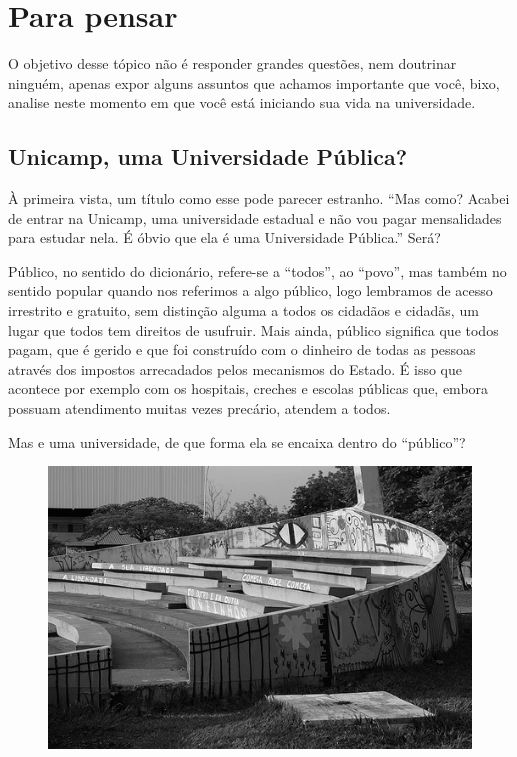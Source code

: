 
\section{Para pensar}

O objetivo desse tópico não é responder grandes questões, nem doutrinar ninguém,
apenas expor alguns assuntos que achamos importante que você, bixo, analise
neste momento em que você está iniciando sua vida na universidade.

\subsection*{Unicamp, uma Universidade Pública?}

À primeira vista, um título como esse pode parecer estranho. ``Mas como? Acabei
de entrar na Unicamp, uma universidade estadual e não vou pagar mensalidades
para estudar nela. É óbvio que ela é uma Universidade Pública.'' Será?

Público, no sentido do dicionário, refere-se a ``todos'', ao ``povo'', mas
também no sentido popular quando nos referimos a algo público, logo lembramos de
acesso irrestrito e gratuito, sem distinção alguma a todos os cidadãos e
cidadãs, um lugar que todos tem direitos de usufruir. Mais ainda, público
significa que todos pagam, que é gerido e que foi construído com o dinheiro de
todas as pessoas através dos impostos arrecadados pelos mecanismos do Estado. É
isso que acontece por exemplo com os hospitais, creches e escolas públicas que,
embora possuam atendimento muitas vezes precário, atendem a todos.

Mas e uma universidade, de que forma ela se encaixa dentro do ``público''?
\begin{figure}[h!]
    \centering
    \includegraphics[scale=0.55,keepaspectratio=true]{img/imgs/4-para_pensar/-028.jpg}
\end{figure}

